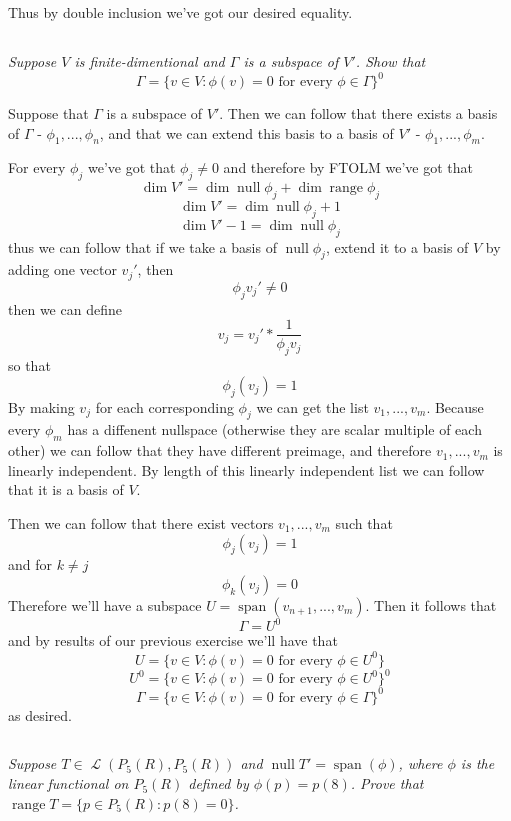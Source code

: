 \documentclass[11pt,oneside,titlepage]{book}
\DeclareMathOperator \map {\mathcal {L}}
\DeclareMathOperator \ns {null}
\DeclareMathOperator \range {range}
\DeclareMathOperator \Span {span}
\begin{document}
Thus by double inclusion we've got our desired equality.

\subsection{}

\textit{Suppose $V$ is finite-dimentional and $\Gamma$ is a subspace of $V'$. Show that }
$$\Gamma = \{v \in V: \phi(v) = 0 \text{ for every } \phi \in \Gamma \}^0$$

Suppose that $\Gamma$ is a subspace of $V'$. Then we can follow that there exists a
basis of $\Gamma$ -  $\phi_1, ..., \phi_n$, and that we can extend this basis to a basis of
$V'$ - $\phi_1, ..., \phi_m$.

For every $\phi_j$ we've got that $\phi_j \neq 0$ and therefore by FTOLM we've got that
$$\dim V' = \dim \ns \phi_j + \dim \range \phi_j$$
$$\dim V' = \dim \ns \phi_j + 1$$
$$\dim V' - 1 = \dim \ns \phi_j$$
thus we can follow that if we take a basis of $\ns \phi_j$, extend it to a basis of $V$ by adding
one vector $v_j'$, then
$$\phi_j v_j' \neq 0$$
then we can define
$$v_j = v_j' * \frac{1}{\phi_j v_j}$$
so that
$$\phi_j(v_j) = 1$$
By making $v_j$ for each corresponding $\phi_j$ we can get the list $v_1, ..., v_m$.
Because every $\phi_m$ has a diffenent nullspace (otherwise they are scalar multiple
of each other) we can follow that they have different preimage, and therefore
$v_1, ..., v_m$ is linearly independent. By length of this linearly independent list we
can follow that it is a basis of $V$.

Then we can follow that there exist vectors
$v_1, ..., v_m$ such that
$$\phi_j(v_j) = 1$$
and for $k \neq j$
$$\phi_k(v_j) = 0$$
Therefore we'll have a subspace $U = \Span(v_{n + 1}, ..., v_m)$. Then it follows that
$$\Gamma = U^0$$
and by results of our previous exercise we'll have that
$$U =  \{v \in V: \phi(v) = 0 \text{ for every } \phi \in U^0 \}$$
$$U^0 =  \{v \in V: \phi(v) = 0 \text{ for every } \phi \in U^0 \}^0$$
$$\Gamma =  \{v \in V: \phi(v) = 0 \text{ for every } \phi \in \Gamma \}^0$$
as desired.

\subsection{}

\textit{Suppose $T \in \map(P_5(R), P_5(R))$ and $\ns T' = \Span(\phi)$, where $\phi$ is
  the linear functional on $P_5(R)$ defined by $\phi(p) = p(8)$. Prove that
  $\range T = \{p \in P_5(R): p(8) = 0\}$.}
\end{document}
